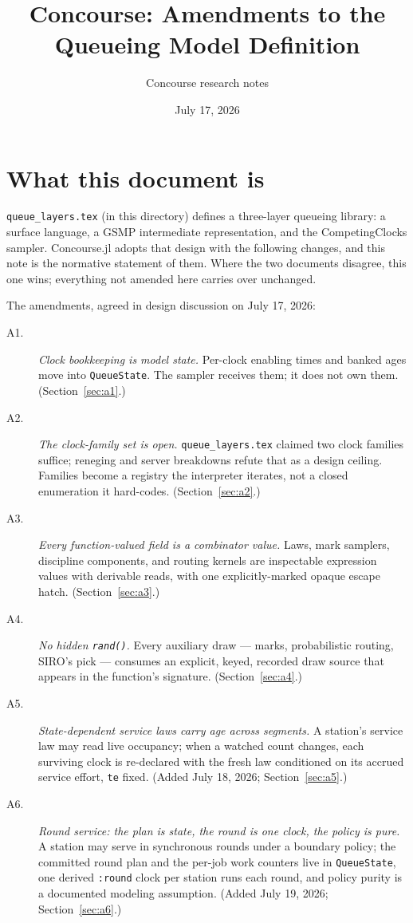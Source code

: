 \documentclass[11pt]{article}
\title{Concourse: Amendments to the Queueing Model Definition}
\author{Concourse research notes}
\date{July 17, 2026}
\newcommand{\code}[1]{\texttt{#1}}
\begin{document}
\maketitle
\tableofcontents

\section{What this document is}

\code{queue\_layers.tex} (in this directory) defines a three-layer queueing
library: a surface language, a GSMP intermediate representation, and the
CompetingClocks sampler. Concourse.jl adopts that design with the following
changes, and this note is the normative statement of them. Where the two
documents disagree, this one wins; everything not amended here carries over
unchanged.

The amendments, agreed in design discussion on July 17, 2026:

\begin{description}
\item[A1.] \emph{Clock bookkeeping is model state.} Per-clock enabling times
  and banked ages move into \code{QueueState}. The sampler receives them; it
  does not own them. (Section~\ref{sec:a1}.)
\item[A2.] \emph{The clock-family set is open.} \code{queue\_layers.tex}
  claimed two clock families suffice; reneging and server breakdowns refute
  that as a design ceiling. Families become a registry the interpreter
  iterates, not a closed enumeration it hard-codes. (Section~\ref{sec:a2}.)
\item[A3.] \emph{Every function-valued field is a combinator value.} Laws,
  mark samplers, discipline components, and routing kernels are inspectable
  expression values with derivable reads, with one explicitly-marked opaque
  escape hatch. (Section~\ref{sec:a3}.)
\item[A4.] \emph{No hidden \code{rand()}.} Every auxiliary draw --- marks,
  probabilistic routing, SIRO's pick --- consumes an explicit, keyed,
  recorded draw source that appears in the function's signature.
  (Section~\ref{sec:a4}.)
\item[A5.] \emph{State-dependent service laws carry age across segments.}
  A station's service law may read live occupancy; when a watched count
  changes, each surviving clock is re-declared with the fresh law
  conditioned on its accrued service effort, \code{te} fixed. (Added
  July 18, 2026; Section~\ref{sec:a5}.)
\item[A6.] \emph{Round service: the plan is state, the round is one
  clock, the policy is pure.} A station may serve in synchronous rounds
  under a boundary policy; the committed round plan and the per-job work
  counters live in \code{QueueState}, one derived \code{:round} clock per
  station runs each round, and policy purity is a documented modeling
  assumption. (Added July 19, 2026; Section~\ref{sec:a6}.)
\end{description}
\end{document}
